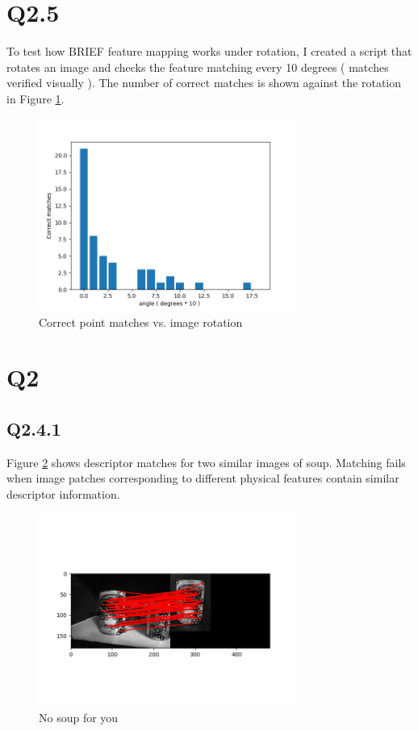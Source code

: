 \documentclass[12pt]{article}
\begin{document}
\section{Q2.5}
To test how BRIEF feature mapping works under rotation, I created a script that rotates an image and checks the feature matching every 10 degrees ( matches verified visually ). The number of correct matches is shown against the rotation in Figure \ref{fig:imgrot}.
\begin{figure}[H]
\centering
\includegraphics[page=1,width=0.75\textwidth]{q2_5}
\caption{ Correct point matches vs. image rotation } 
\label{fig:imgrot}
\end{figure}   


\section { Q2 }
\subsection { Q2.4.1 }

Figure \ref{fig:plotmatch} shows descriptor matches for two similar images of soup. Matching fails when image patches corresponding to different physical features contain similar descriptor information.

\begin{figure}[H]
\centering
\includegraphics[page=1,width=0.75\textwidth]{q2_4}
\caption{ No soup for you }
\label{fig:plotmatch}
\end{figure}   
\end{document}
